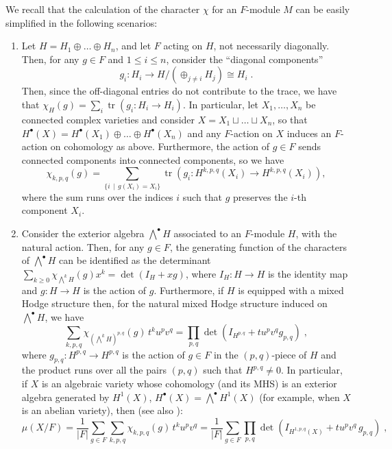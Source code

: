 \documentclass[11pt,english]{amsart}
\numberwithin{equation}{section}
\numberwithin{figure}{section}
\theoremstyle{plain}
\theoremstyle{plain}
\theoremstyle{definition}
\theoremstyle{remark}
\newcommand{\tr}{\operatorname{tr}}
\begin{document}
We recall that the calculation of the character $\chi$ for an $F$-module $M$ can be easily simplified in the following scenarios:
\begin{enumerate}
    \item\label{item:disjoint-union} Let $H = H_1 \oplus \ldots \oplus H_n$, and let $F$ acting on $H$, not necessarily diagonally. Then, for any $g \in F$ and $1 \leq i \leq n$, consider the ``diagonal components''
    $$
        g_i: H_i \to H/\left({\displaystyle \oplus_{j\neq i} H_j}\right) \cong H_i\; .
    $$
    Then, since the off-diagonal entries do not contribute to the trace, we have that $\chi_H(g) = \sum_i \tr(g_i: H_i \to H_i)$. In particular, let $X_1, \ldots, X_n$ be connected complex varieties and consider $X = X_1 \sqcup \ldots \sqcup X_n$, so that $H^\bullet(X) = H^\bullet(X_1) \oplus \ldots \oplus H^\bullet(X_n)$ and any $F$-action on $X$ induces an $F$-action on cohomology as above. Furthermore, the action of $g \in F$ sends connected components into connected components, so we have
    $$
        \chi_{k,p,q}(g) = \sum_{\{i \,\mid\, g(X_i) = X_i\}} \tr\left(g_i: H^{k,p,q}(X_i) \to H^{k,p,q}(X_i)\right),
    $$
    where the sum runs over the indices $i$ such that $g$ preserves the $i$-th component $X_i$.
    \item\label{item:determinant} Consider the exterior algebra $\bigwedge^\bullet H$ associated to an $F$-module $H$, with the natural action. Then, for any $g \in F$, the generating function of the characters of $\bigwedge^\bullet H$ can be identified as the determinant $\sum_{k\geq 0} \chi_{\bigwedge^k H}(g)x^k = \det(I_H+xg)$, where $I_H: H \to H$ is the identity map and $g: H \to H$ is the action of $g$. Furthermore, if $H$ is equipped with a mixed Hodge structure then, for the natural mixed Hodge structure induced on $\bigwedge^\bullet H$, we have
    $$
        \sum_{k, p, q} \chi_{(\bigwedge^k H)^{p,q}}(g)\,t^ku^p v^q = \prod_{p,q} \det(I_{H^{p,q}}+t u^p v^q g_{p,q})\; ,
    $$
    where $g_{p,q}: H^{p,q} \to H^{p,q}$ is the action of $g \in F$ in the $(p,q)$-piece of $H$ and the product runs over all the pairs $(p,q)$ such that $H^{p,q} \neq 0$. In particular, if $X$ is an algebraic variety whose cohomology (and its MHS) is an exterior algebra generated by $H^1(X)$, $H^\bullet(X) = \bigwedge^\bullet H^1(X)$ (for example, when $X$ is an abelian variety), then (see also \cite{FS}):
    $$
    \mu(X/F) = \frac{1}{|F|}\sum_{g \in F}\sum_{k,p,q} \chi_{k,p,q}(g) \,t^ku^pv^q = \frac{1}{|F|}\sum_{g \in F} \prod_{p,q}\det(I_{H^{1, p, q}(X)} + tu^pv^q\,g_{p,q})\; ,
    $$

\end{enumerate}
\end{document}
